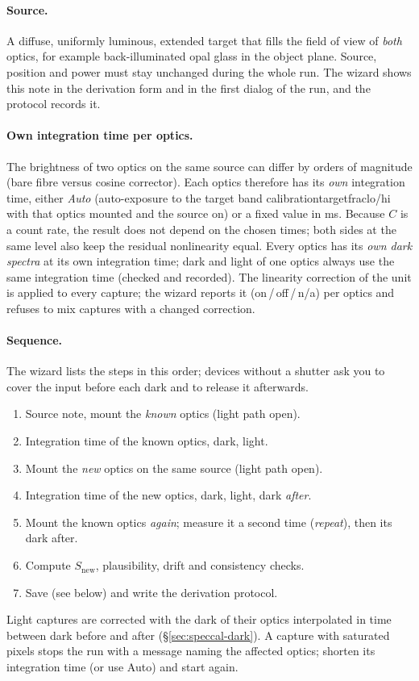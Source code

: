 \documentclass[12pt,a4paper]{article}
\DeclareRobustCommand{\key}[1]{{\ttfamily\small\color{acc2}\def\_{\rawus\allowbreak}#1}}
\begin{document}
\paragraph{Source.} A diffuse, uniformly luminous, extended target that fills the
field of view of \emph{both} optics, for example back-illuminated opal glass in
the object plane. Source, position and power must stay unchanged during the
whole run. The wizard shows this note in the derivation form and in the first
dialog of the run, and the protocol records it.

\paragraph{Own integration time per optics.} The brightness of two optics on the
same source can differ by orders of magnitude (bare fibre versus cosine
corrector). Each optics therefore has its \emph{own} integration time, either
\emph{Auto} (auto-exposure to the target band
\key{calibration\_target\_frac\_lo/hi} with that optics mounted and the source on)
or a fixed value in ms. Because $C$ is a count rate, the result does not depend on
the chosen times; both sides at the same level also keep the residual
nonlinearity equal. Every optics has its \emph{own dark spectra} at its own
integration time; dark and light of one optics always use the same integration
time (checked and recorded). The linearity correction of the unit is applied to
every capture; the wizard reports it (on\,/\,off\,/\,n/a) per optics and refuses to
mix captures with a changed correction.

\paragraph{Sequence.} The wizard lists the steps in this order; devices without a
shutter ask you to cover the input before each dark and to release it afterwards.
\begin{enumerate}
  \item Source note, mount the \emph{known} optics (light path open).
  \item Integration time of the known optics, dark, light.
  \item Mount the \emph{new} optics on the same source (light path open).
  \item Integration time of the new optics, dark, light, dark \emph{after}.
  \item Mount the known optics \emph{again}; measure it a second time
        (\emph{repeat}), then its dark after.
  \item Compute $S_{\mathrm{new}}$, plausibility, drift and consistency checks.
  \item Save (see below) and write the derivation protocol.
\end{enumerate}
Light captures are corrected with the dark of their optics interpolated in time
between dark before and after (\S\ref{sec:speccal-dark}). A capture with saturated
pixels stops the run with a message naming the affected optics; shorten its
integration time (or use Auto) and start again.
\end{document}

